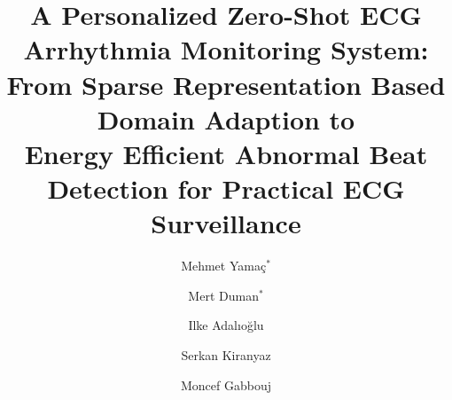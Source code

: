 \documentclass[journal,transmag]{IEEEtran}
\begin{document}
\title{A Personalized Zero-Shot ECG Arrhythmia Monitoring System: \\ From Sparse Representation Based Domain Adaption to \\ Energy Efficient Abnormal Beat Detection for Practical ECG Surveillance}





\author[1]{Mehmet Yama\c{c}$^*$}
\author[1]{Mert Duman$^*$}
\author[1]{Ilke Adalıoğlu}
\author[2]{Serkan Kiranyaz}
\author[1]{Moncef Gabbouj}





















\maketitle
\end{document}
